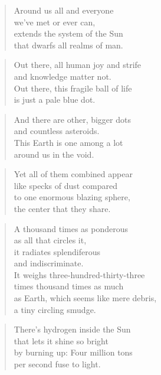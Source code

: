 \documentclass[14pt,a4paper]{article}
\begin{document}
\begin{verse}
Around us all and everyone\\
we’ve met or ever can,\\
extends the system of the Sun\\
that dwarfs all realms of man.
\end{verse}

\begin{verse}
Out there, all human joy and strife\\
and knowledge matter not.\\
Out there, this fragile ball of life\\
is just a pale blue dot.
\end{verse}

\begin{verse}
And there are other, bigger dots\\
and countless asteroids.\\
This Earth is one among a lot\\
around us in the void.
\end{verse}

\begin{verse}
Yet all of them combined appear\\
like specks of dust compared\\
to one enormous blazing sphere,\\
the center that they share.
\end{verse}

\begin{verse}
A thousand times as ponderous\\
as all that circles it,\\
it radiates splendiferous\\
and indiscriminate.
\\
It weighs three-hundred-thirty-three\\
times thousand times as much\\
as Earth, which seems like mere debris,\\
a tiny circling smudge.
\end{verse}

\begin{verse}
There’s hydrogen inside the Sun\\
that lets it shine so bright\\
by burning up: Four million tons\\
per second fuse to light.
\end{verse}
\end{document}
